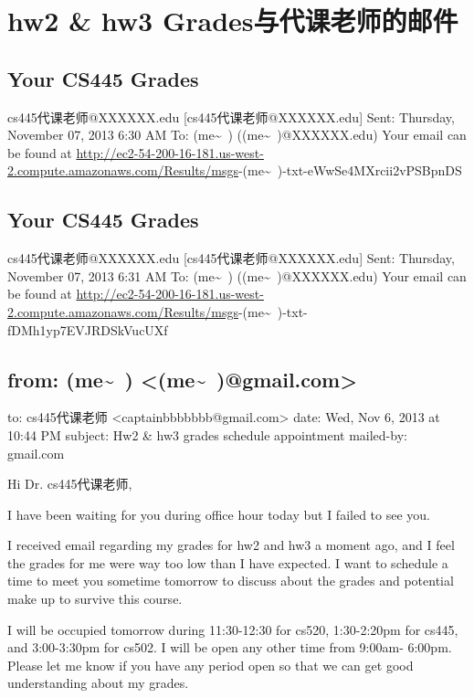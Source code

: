 \documentclass[12pt]{book}
\begin{document}
\chapter{hw2 \& hw3 Grades与代课老师的邮件}
\label{sec-35}

\section{Your CS445 Grades}
\label{sec-35-1}
cs445代课老师@XXXXXX.edu [cs445代课老师@XXXXXX.edu]
Sent:        Thursday, November 07, 2013 6:30 AM
To:        
 (me\textasciitilde{}~) ((me\textasciitilde{}~)@XXXXXX.edu)
Your email can be found at \url{http://ec2-54-200-16-181.us-west-2.compute.amazonaws.com/Results/msgs}-(me\textasciitilde{}~)-txt-eWwSe4MXrcii2vPSBpnDS

\section{Your CS445 Grades}
\label{sec-35-2}
cs445代课老师@XXXXXX.edu [cs445代课老师@XXXXXX.edu]
Sent:        Thursday, November 07, 2013 6:31 AM
To:        
 (me\textasciitilde{}~) ((me\textasciitilde{}~)@XXXXXX.edu)
Your email can be found at \url{http://ec2-54-200-16-181.us-west-2.compute.amazonaws.com/Results/msgs}-(me\textasciitilde{}~)-txt-fDMh1yp7EVJRDSkVucUXf

\section{from:         (me\textasciitilde{}~) <(me\textasciitilde{}~)@gmail.com>}
\label{sec-35-3}
to:         cs445代课老师 <captainbbbbbbb@gmail.com>
date:         Wed, Nov 6, 2013 at 10:44 PM
subject:         Hw2 \& hw3 grades  schedule appointment
mailed-by:         gmail.com

Hi Dr. cs445代课老师, 

I have been waiting for you during office hour today but I failed to see you. 

I received email regarding my grades for hw2 and hw3 a moment ago, and I feel the grades for me were way too low than I have expected. I want to schedule a time to meet you sometime tomorrow to discuss about the grades and potential make up to survive this course. 

I will be occupied tomorrow during 11:30-12:30 for cs520, 1:30-2:20pm for cs445, and 3:00-3:30pm for cs502. I will be open any other time from 9:00am- 6:00pm. Please let me know if you have any period open so that we can get good understanding about my grades. 
\end{document}
